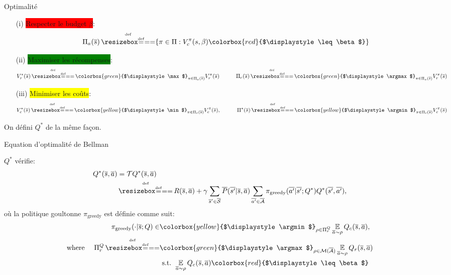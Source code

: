 \documentclass[french,handout]{beamer}
\newcommand{\mathcolorbox}[2]{\colorbox{#1}{$\displaystyle #2$}}
\begin{document}
    \begin{frame}{Optimalité}
        \begin{definition}
            \begin{enumerate}
                \item[(i)] \pause\colorbox{red}{Respecter le budget $\beta$}:
                \begin{equation*}
                    \Pi_a(\os) \eqdef \{\pi\in\Pi: V_c^\pi(s, \beta) \mathcolorbox{red}{\leq \beta}\}
                \end{equation*}
                \item[(ii)] \pause\colorbox{green}{Maximiser les récompenses}:
                \begin{equation*}
                    V_r^*(\os) \eqdef \mathcolorbox{green}{\max}_{\pi\in\Pi_a(\os)}  V_r^\pi(\os) \qquad\quad \Pi_r(\os) \eqdef \mathcolorbox{green}{\argmax}_{\pi\in\Pi_a(\os)}  V_r^\pi(\os)
                \end{equation*}
                \item[(iii)] \pause\colorbox{yellow}{Minimiser les coûts}:
                \begin{equation*}
                    V_c^*(\os) \eqdef \mathcolorbox{yellow}{\min}_{\pi\in\Pi_r(\os)}  V_c^\pi(\os), \qquad\quad \Pi^*(\os) \eqdef \mathcolorbox{yellow}{\argmin}_{\pi\in\Pi_r(\os)}  V_c^\pi(\os)
                \end{equation*}
            \end{enumerate}

            \pause On défini $Q^*$ de la même façon.
        \end{definition}
    \end{frame}

    \begin{frame}{Equation d'optimalité de Bellman}
        \begin{theorem}
            $Q^*$ vérifie:
            \begin{align*}
                Q^{*}(\os, \oa) &= \cT Q^{*}(\os, \oa)\\
                &\eqdef R(\os, \oa) + \gamma \sum_{\os'\in\ocS} \ov{P}(\ov{s'} | \os, \oa)\sum_{\ov{a'}\in \ocA} \pi_\text{greedy}(\ov{a'}|\ov{s'}; Q^*) Q^{*}(\ov{s'}, \ov{a'}),
            \end{align*}
            où la politique goultonne $\pi_\text{greedy}$ est définie comme suit:
            \begin{align*}
                \pi_\text{greedy}(\cdot|\os; Q) \in &\mathcolorbox{yellow}{\argmin}_{\rho\in\Pi_r^Q} \expectedvalueover{\oa\sim\rho}Q_c(\os, \oa), \\
                \text{where }\quad \Pi_r^Q \eqdef &\mathcolorbox{green}{\argmax}_{\rho\in\cM(\ocA)} \expectedvalueover{\oa\sim\rho} Q_r(\os, \oa) \\
                & \text{ s.t. }  \expectedvalueover{\oa\sim\rho} Q_c(\os, \oa) \mathcolorbox{red}{\leq \beta}
            \end{align*}
        \end{theorem}
    \end{frame}
\end{document}
